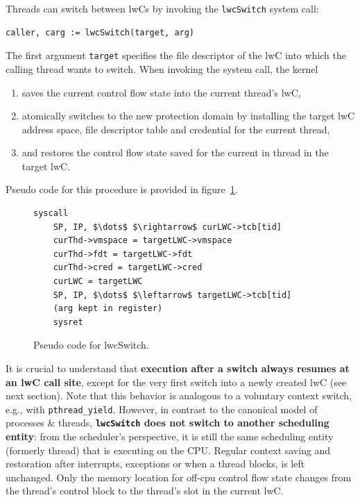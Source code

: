 \documentclass[10pt,twocolumn,a4paper]{article}
\begin{document}
Threads can switch between lwCs by invoking the \lstinline{lwcSwitch} system call:

\begin{lstlisting}[style=syscallinline]
  caller, carg := lwcSwitch(target, arg) 
\end{lstlisting}

The first argument \lstinline{target} specifies the file descriptor of the lwC into which the calling thread wants to switch.
When invoking the system call, the kernel
\begin{enumerate}[nosep,label=(\alph*)]
\item saves the current control flow state into the current thread's lwC,
\item atomically switches to the new protection domain by installing the target lwC address space, file descriptor table and credential for the current thread,
\item and restores the control flow state saved for the current in thread in the target lwC.
\end{enumerate}
Pseudo code for this procedure is provided in figure~\ref{design:fig:switchpseudocode}.
\cite{lwckernelrepo,lwcpaper}

\begin{figure}[b]
  \begin{lstlisting}[basicstyle=\footnotesize\ttfamily,mathescape,frame=single,linewidth=0.9\linewidth,belowskip=0pt,aboveskip=0pt,xleftmargin=0.05\linewidth]
    syscall
    SP, IP, $\dots$ $\rightarrow$ curLWC->tcb[tid]
    curThd->vmspace = targetLWC->vmspace
    curThd->fdt = targetLWC->fdt
    curThd->cred = targetLWC->cred
    curLWC = targetLWC
    SP, IP, $\dots$ $\leftarrow$ targetLWC->tcb[tid]
    (arg kept in register)
    sysret  
  \end{lstlisting}
  \caption{Pseudo code for lwcSwitch.}
  \label{design:fig:switchpseudocode}
\end{figure}

It is crucial to understand that \textbf{execution after a switch always resumes at an lwC call site}, except for the very first switch into a newly created lwC (see next section).
Note that this behavior is analogous to a voluntary context switch, e.g., with \lstinline{pthread_yield}.
However, in contrast to the canonical model of processes \& threads, \textbf{\lstinline{lwcSwitch} does not switch to another scheduling entity}:
from the scheduler's perspective, it is still the same scheduling entity (formerly thread) that is executing on the CPU.
Regular context saving and restoration after interrupts, exceptions or when a thread blocks, is left unchanged.
Only the memory location for off-cpu control flow state changes from the thread's control block to the thread's slot in the current lwC.
\cite{lwckernelrepo}
\end{document}
